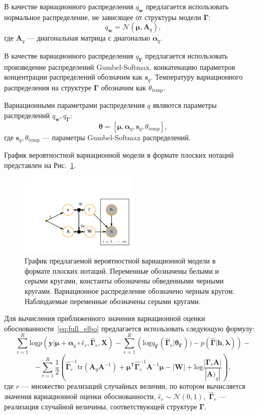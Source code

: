 В качестве вариационного распределения $q_{\mathbf{w}}$ предлагается использовать нормальное распределение, не зависящее от структуры модели $\boldsymbol{\Gamma}$:
\[
    q_{\mathbf{w}} = \mathcal{N}(\boldsymbol{\mu}, \mathbf{A}_q), 
\]
где $\mathbf{A}_q$ --- диагональная матрица с диагональю $\boldsymbol{\alpha}_q$.

В качестве вариационного распределения $q_{\boldsymbol{\Gamma}}$ предлагается использовать произведение распределений Gumbel-Softmax. конкатенацию параметров концентрации распределений обозначим как $\mathbf{s}_q$. Температуру вариационного распределения на структуре $\boldsymbol{\Gamma}$ обозначим как $\theta_\text{temp}$.

Вариационными параметрами распределения $q$ являются параметры распределений $q_{\mathbf{w}}, q_{\boldsymbol{\Gamma}}$:
\[
    \boldsymbol{\theta} = [\boldsymbol{\mu}, \boldsymbol{\alpha}_q, \mathbf{s}_q, \theta_\text{temp}], 
\]
где $ \mathbf{s}_q, \theta_\text{temp}$ --- параметры Gumbel-Softmax распределений.

График вероятностной вариационной модели в формате плоских нотаций представлен на Рис.~\ref{fig:plate_qprob}.
\begin{figure}
\centering
   \includegraphics[width=0.5\textwidth]{plots/notebooks/plate.pdf}
\caption{График предлагаемой вероятностной вариационной модели в формате плоских нотаций. Переменные обозначены белыми и серыми кругами, константы обозначены обведенными черными кругами. Вариационное распределение обозначено черным кругом. Наблюдаемые переменные обозначены серыми кругами.}
\label{fig:plate_qprob}
\end{figure}


Для вычисления приближенного значения вариационной оценки обоснованности~\eqref{eq:full_elbo} предлагается использовать следующую формулу:
\[
    \sum_{r=1}^R \text{log}p(\mathbf{y}|\boldsymbol{\mu}+\boldsymbol{\alpha}_q \circ \hat{\epsilon}_r, \hat{\boldsymbol{\Gamma}}_r, \mathbf{X}) - \sum_{r=1}^R \left(\text{log}q_{\boldsymbol{\Gamma}}(\hat{\boldsymbol{\Gamma}}_r|\boldsymbol{\theta}_{\boldsymbol{\Gamma}})) - p(\hat{\boldsymbol{\Gamma}}|\mathbf{h},\boldsymbol{\lambda})\right) -
\]
\[ -\sum_{r=1}^R\frac{1}{2}\left( \hat{\boldsymbol{\Gamma}}_r^{-1}\text{tr}(\mathbf{A}_q\mathbf{A}^{-1}) + \boldsymbol{\mu}^{\mathsf{T}}\hat{\boldsymbol{\Gamma}}_r^{-1}\mathbf{A}^{-1}\boldsymbol{\mu} - |\mathbf{W}| + \text{log}\frac{|\boldsymbol{\Gamma}_r\mathbf{A}|}{|\mathbf{A})_q|}\right),
\]
где $r$ --- множество реализаций случайных величин, по котором вычисляется значения вариационной оценки обоснованности, $\hat{\epsilon}_r \sim \mathcal{N}(0,1),$
 $\hat{\boldsymbol{\Gamma}}_r$ --- реализация случайной величины, соответствующей структуре $\boldsymbol{\Gamma}$.


